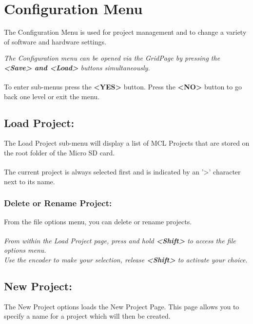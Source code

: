 \chapter{Configuration Menu}
The Configuration Menu is used for project management and to change a variety of software and hardware settings.


\textit{The Configuration menu can be opened via the GridPage by pressing the \textbf{<Save> and <Load>} buttons simultaneously.}\\\\
To enter sub-menus press the \textbf{<YES>} button. Press the \textbf{<NO>} button to go back one level or exit the menu.
\section{Load Project:}
The Load Project sub-menu will display a list of MCL Projects that are stored on the root folder of the Micro SD card.\\\\
The current project is always selected first and is indicated by an '>' character next to its name.

\subsection{Delete or Rename Project:}
From the file options menu, you can delete or rename projects.\\\\
\textit{From within the Load Project page, press and hold \textbf{<Shift>} to access the file options menu.\\
Use the encoder to make your selection, release \textbf{<Shift>} to activate your choice.}

\newpage
\section{New Project:}
The New Project options loads the New Project Page. This page allows you to specify a name for a project which will then be created.\\


